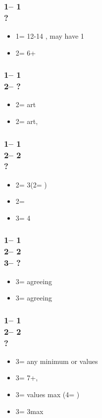 \documentclass[12pt, a4paper]{article}
\begin{document}
\subsubsection*{1\diams -- 1\spades\\ ?}
\begin{itemize}
    \item 1\nt = 12-14 \bal, may have 1\spades
    \item 2\diams = 6+\diams
\end{itemize}

\subsubsection*{1\diams -- 1\spades\\
                2\diams -- ?}
\begin{itemize}
    \item 2\hearts = \gf art \vimp
    \item 2\nt = \inv art, \fton{3\diams} \vimp
\end{itemize}

\subsubsection*{1\diams -- 1\spades\\
                2\diams -- 2\hearts \\ ?}
\begin{itemize}
    \item 2\spades = 3\spades (2\nt = \lsf)
    \item 2\nt = \nat
    \item 3\clubs = 4\hearts \vimp
\end{itemize}

\subsubsection*{1\diams -- 1\spades\\
                2\diams -- 2\hearts \\
                3\clubs -- ?}
\begin{itemize}
    \item 3\diams = agreeing \diams
    \item 3\hearts = agreeing \hearts
\end{itemize}

\subsubsection*{1\diams -- 1\spades\\
                2\diams -- 2\nt \\ ?}
\begin{itemize}
    \item 3\clubs = any minimum or \clubs values
    \item 3\diams = 7+\diams, \gf
    \item 3\hearts = \hearts values max (4\diams = \nf)
    \item 3\spades = 3\spades max
\end{itemize}
\end{document}
